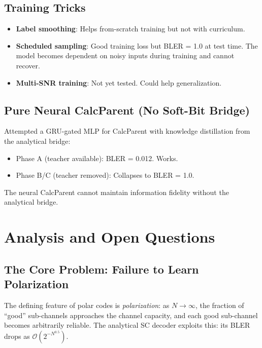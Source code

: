 \documentclass[10pt]{article}
\begin{document}
\subsection{Training Tricks}

\begin{itemize}[nosep]
    \item \textbf{Label smoothing}: Helps from-scratch training but not with curriculum.
    \item \textbf{Scheduled sampling}: Good training loss but BLER = 1.0 at test time. The model becomes dependent on noisy inputs during training and cannot recover.
    \item \textbf{Multi-SNR training}: Not yet tested. Could help generalization.
\end{itemize}

\subsection{Pure Neural CalcParent (No Soft-Bit Bridge)}

Attempted a GRU-gated MLP for CalcParent with knowledge distillation from the analytical bridge:
\begin{itemize}[nosep]
    \item Phase A (teacher available): BLER = 0.012. Works.
    \item Phase B/C (teacher removed): Collapses to BLER = 1.0.
\end{itemize}
The neural CalcParent cannot maintain information fidelity without the analytical bridge.

\section{Analysis and Open Questions}

\subsection{The Core Problem: Failure to Learn Polarization}

The defining feature of polar codes is \emph{polarization}: as $N \to \infty$, the fraction of ``good'' sub-channels approaches the channel capacity, and each good sub-channel becomes arbitrarily reliable. The analytical SC decoder exploits this: its BLER drops as $\mathcal{O}(2^{-N^{0.5}})$.
\end{document}
